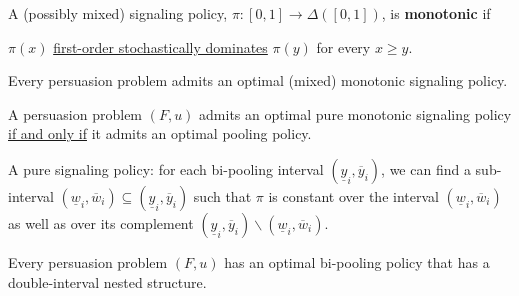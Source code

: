 \documentclass[11pt]{elegantbook}
\begin{document}
\begin{definition}
    \normalfont
    A (possibly mixed) signaling policy, $\pi : [0, 1] \rightarrow \Delta ([0,1])$, is \textbf{monotonic} if
    \begin{center}
        $\pi(x)$ \underline{first-order stochastically dominates} $\pi(y)$ for every $x\geq y$.
    \end{center}
\end{definition}

\begin{proposition}
    Every persuasion problem admits an optimal (mixed) monotonic signaling policy.
\end{proposition}

\begin{lemma}
    A persuasion problem $(F,u)$ admits an optimal pure monotonic signaling policy \underline{if and only if} it admits an optimal pooling policy.
\end{lemma}

\begin{definition}
    \normalfont
    A pure signaling policy: for each bi-pooling interval $(\underline{y}_i,\overline{y}_i)$, we can find a sub-interval $(\underline{w}_i,\overline{w}_i) \subseteq (\underline{y}_i,\overline{y}_i)$ such that $\pi$ is constant over the interval $(\underline{w}_i,\overline{w}_i)$ as well as over its complement $(\underline{y}_i,\overline{y}_i)\backslash (\underline{w}_i,\overline{w}_i)$.
\end{definition}

\begin{corollary}
    Every persuasion problem $(F,u)$ has an optimal bi-pooling policy that has a double-interval nested structure.
\end{corollary}
\end{document}

